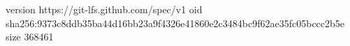 version https://git-lfs.github.com/spec/v1
oid sha256:9373c8ddb35ba44d16bb23a9f4326e41860e2c3484bc9f62ae35fc05bccc2b5e
size 368461
